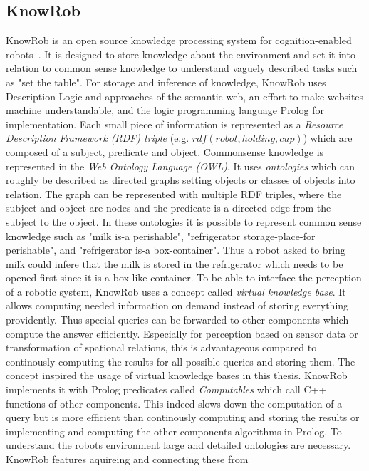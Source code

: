 \documentclass[a4paper,11pt]{article}
\begin{document}
\subsection{KnowRob}
\label{sec:knowrob}
KnowRob is an open source knowledge processing system for
cognition-enabled robots~\cite{KnowRob,KnowRob-Representation}. It is
designed to store knowledge about the environment and set it into
relation to common sense knowledge to understand vaguely described
tasks such as "set the table". For storage and inference of knowledge,
KnowRob uses Description Logic and approaches of the semantic web, an
effort to make websites machine understandable, and the logic
programming language Prolog for implementation. Each small piece of
information is represented as a \emph{Resource Description Framework
  (RDF) triple} (e.g. $rdf(robot, holding, cup)$) which are composed
of a subject, predicate and object. Commonsense knowledge is
represented in the \emph{Web Ontology Language (OWL)}. It uses
\emph{ontologies} which can roughly be described as directed graphs
setting objects or classes of objects into relation. The graph can be
represented with multiple RDF triples, where the subject and object
are nodes and the predicate is a directed edge from the subject to the
object. In these ontologies it is possible to represent common sense
knowledge such as "milk is-a perishable", "refrigerator
storage-place-for perishable", and "refrigerator is-a
box-container". Thus a robot asked to bring milk could infere that the
milk is stored in the refrigerator which needs to be opened first
since it is a box-like container.  To be able to interface the
perception of a robotic system, KnowRob uses a concept called
\emph{virtual knowledge base}. It allows computing needed information
on demand instead of storing everything providently. Thus special
queries can be forwarded to other components which compute the answer
efficiently. Especially for perception based on sensor data or
transformation of spational relations, this is advantageous compared
to continously computing the results for all possible queries and
storing them. The concept inspired the usage of virtual knowledge
bases in this thesis. KnowRob implements it with Prolog predicates
called \emph{Computables} which call C++ functions of other
components. This indeed slows down the computation of a query but is
more efficient than continously computing and storing the results or
implementing and computing the other components algorithms in Prolog.
To understand the robots environment large and detailed ontologies are
necessary. KnowRob features aquireing and connecting these from
\end{document}
